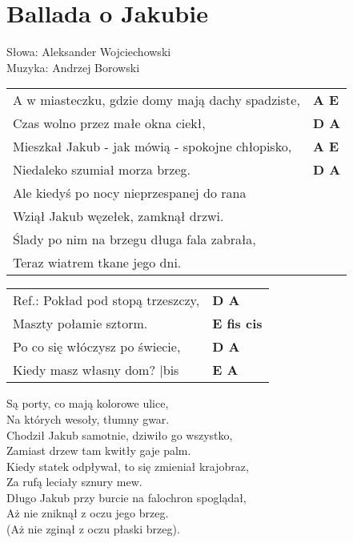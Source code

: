 \section{Ballada o Jakubie}

Słowa: Aleksander Wojciechowski \\
Muzyka: Andrzej Borowski

\vspace{2em}
\begin{tabular}{@{}p{9cm}@{}l@{}}
A w miasteczku, gdzie domy mają dachy spadziste, & \bfseries A E \\
Czas wolno przez małe okna ciekł, & \bfseries D A \\
Mieszkał Jakub - jak mówią - spokojne chłopisko, & \bfseries A E \\
Niedaleko szumiał morza brzeg. & \bfseries D A \\
Ale kiedyś po nocy nieprzespanej do rana \\
Wziął Jakub węzełek, zamknął drzwi. \\
Ślady po nim na brzegu długa fala zabrała, \\
Teraz wiatrem tkane jego dni. \\
\end{tabular}

\vspace{1em}
\begin{tabular}{@{}p{9cm}@{}l@{}}
Ref.: Pokład pod stopą trzeszczy, & \bfseries D A \\
Maszty połamie sztorm. & \bfseries E fis cis \\
Po co się włóczysz po świecie, & \bfseries D A \\
Kiedy masz własny dom?          |bis & \bfseries E A \\
\end{tabular}

\vspace{1em}
Są porty, co mają kolorowe ulice, \\
Na których wesoły, tłumny gwar. \\
Chodził Jakub samotnie, dziwiło go wszystko, \\
Zamiast drzew tam kwitły gaje palm. \\
Kiedy statek odpływał, to się zmieniał krajobraz, \\
Za rufą leciały sznury mew. \\
Długo Jakub przy burcie na falochron spoglądał, \\
Aż nie zniknął z oczu jego brzeg. \\
(Aż nie zginął z oczu płaski brzeg). \\
\newpage

